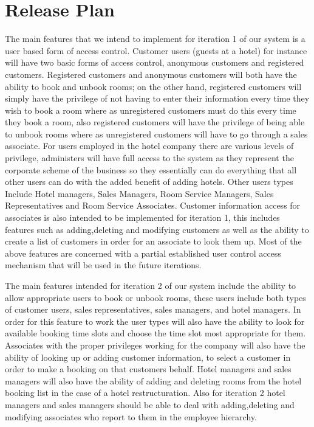 \section{Release Plan}

The main features that we intend to implement for iteration 1 of our system is a user based form of access control. Customer users (guests at a hotel) for instance will have two basic forms of access control, anonymous customers and registered customers. Registered customers and anonymous customers will both have the ability to book and unbook rooms; on the other hand, registered customers will simply have the privilege of not having to enter their information every time they wish to book a room where as unregistered customers must do this every time they book a room, also registered customers will have the privilege of being able to unbook rooms where as unregistered customers will have to go through a sales associate. For users employed in the hotel company there are various levels of privilege, administers will have full access to the system as they represent the corporate scheme of the business so they essentially can do everything that all other users can do with the added benefit of adding hotels. Other users types Include Hotel managers, Sales Managers, Room Service Managers, Sales Representatives and Room Service Associates. Customer information access for associates is also intended to be implemented for iteration 1, this includes features such as adding,deleting and modifying customers as well as the ability to create a list of customers in order for an associate to look them up. Most of the above features are concerned with a partial established user control access mechanism that will be used in the future iterations.

The main features intended for iteration 2 of our system include the ability to allow appropriate users to book or unbook rooms, these users include both types of customer users, sales representatives, sales managers, and hotel managers. In order for this feature to work the user types will also have the ability to look for available booking time slots and choose the time slot most appropriate for them. Associates with the proper privileges working for the company will also have the ability of looking up or adding customer information, to select a customer in order to make a booking on that customers behalf. Hotel managers and sales managers will also have the ability of adding and deleting rooms from the hotel booking list in the case of a hotel restructuration. Also for iteration 2 hotel managers and sales managers should be able to deal with adding,deleting and modifying associates who report to them in the employee hierarchy.

